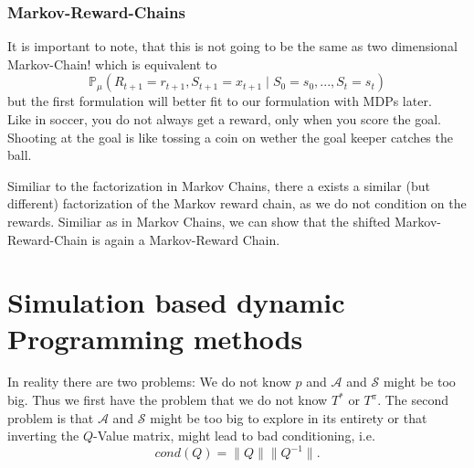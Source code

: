 \documentclass[A4,12pt,twoside]{book}
\begin{document}
\subsection{Markov-Reward-Chains}
It is important to note, that this is not going to be the same as two dimensional Markov-Chain!
which is equivalent to
$$
\mathbb{P}_\mu (R_{t+1} = r_{t+1},S_{t+1}=x_{t+1} \mid S_0 =s_0,...,S_t =s_t) 
$$
but the first formulation will better fit to our formulation with MDPs later.\\
Like in soccer, you do not always get a reward, only when you score the goal. Shooting at the goal is like tossing a coin on wether the goal keeper catches the ball. \\



Similiar to the factorization in Markov Chains, there a exists a similar (but different) factorization of the Markov reward chain, as we do not condition on the rewards.
Similiar as in Markov Chains, we can show that the shifted Markov-Reward-Chain is again a Markov-Reward Chain.




\chapter{Simulation based dynamic Programming methods}
In reality there are two problems: We do not know $p$ and $\mathcal{A}$ and $\mathcal{S}$ might be too big. Thus we first have the problem that we do not know $T^*$ or $T^\pi$. The second problem is that $\mathcal{A}$ and $\mathcal{S}$ might be too big to explore in its entirety or that inverting the $Q$-Value matrix, might lead to bad conditioning, i.e.
$$
cond(Q) = \|Q\|\|Q^{-1}\|. 
$$
\end{document}
